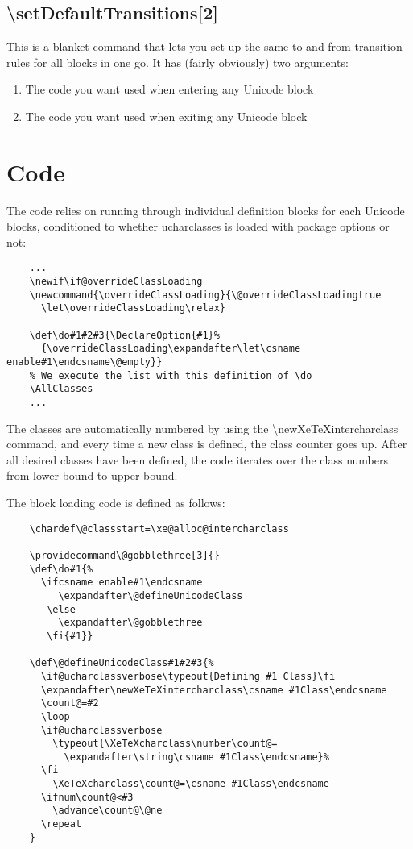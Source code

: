 \documentclass{article}
\newenvironment{numberlist}{%
  \begin{enumerate}
  \setlength{\itemsep}{0pt}
  \setlength{\parsep}{0pt}
  \setlength{\topsep}{0pt}
  \setlength{\partopsep}{0pt}
  \setlength{\parskip}{0pt}
  \setlength{\labelsep}{5pt}}%
{
  \end{enumerate}}
\begin{document}
    \subsection{\textbackslash setDefaultTransitions[2]}

      This is a blanket command that lets you set up the same to and from transition rules for all blocks in one go. It has (fairly obviously) two arguments:

      \begin{numberlist}
        \item The code you want used when entering any Unicode block
        \item The code you want used when exiting any Unicode block
      \end{numberlist}

  \pagebreak

  \section{Code}

    The code relies on running through individual definition blocks for each Unicode blocks, conditioned to whether ucharclasses is loaded with package options or not:

    \disableTransitionRules
    \begin{verbatim}
    ...
    \newif\if@overrideClassLoading
    \newcommand{\overrideClassLoading}{\@overrideClassLoadingtrue
      \let\overrideClassLoading\relax}

    \def\do#1#2#3{\DeclareOption{#1}%
      {\overrideClassLoading\expandafter\let\csname enable#1\endcsname\@empty}}
    % We execute the list with this definition of \do
    \AllClasses
    ...
    \end{verbatim}
    \enableTransitionRules

    The classes are automatically numbered by using the \textbackslash newXeTeXintercharclass command, and every time a new class is defined, the class counter goes up. After all desired classes have been defined, the code iterates over the class numbers from lower bound to upper bound.

    The block loading code is defined as follows:

    \disableTransitionRules
    \begin{verbatim}
    \chardef\@classstart=\xe@alloc@intercharclass

    \providecommand\@gobblethree[3]{}
    \def\do#1{%
      \ifcsname enable#1\endcsname
         \expandafter\@defineUnicodeClass
       \else
         \expandafter\@gobblethree
       \fi{#1}}

    \def\@defineUnicodeClass#1#2#3{%
      \if@ucharclassverbose\typeout{Defining #1 Class}\fi
      \expandafter\newXeTeXintercharclass\csname #1Class\endcsname
      \count@=#2
      \loop
      \if@ucharclassverbose
        \typeout{\XeTeXcharclass\number\count@=
          \expandafter\string\csname #1Class\endcsname}%
      \fi
        \XeTeXcharclass\count@=\csname #1Class\endcsname
      \ifnum\count@<#3
        \advance\count@\@ne
      \repeat
    }
    \end{verbatim}
    \enableTransitionRules
\end{document}
